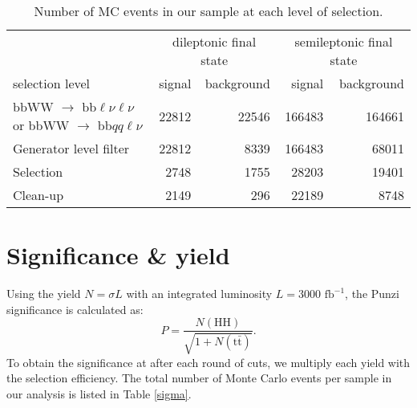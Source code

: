 \documentclass[10pt,a4paper]{article}
\renewcommand{\tt}{$\text{t}\bar{\text{t}}$}
\newcommand{\channels}{bbWW $\rightarrow$ bb$\ell\nu\ell\nu$ or bbWW $\rightarrow$ bb$qq\ell\nu$ }
\begin{document}
\begin{table}[p]
	\centering
	\caption{Number of MC events in our sample at each level of selection.} \vspace{5pt}
	\label{raw}
	\begin{tabular}{@{\quad}lrrrr@{}}
	
	\toprule
	               & \multicolumn{2}{c}{dileptonic final state} & \multicolumn{2}{c}{semileptonic final state} \\
	\cmidrule(r){2-3} \cmidrule(r){4-5}
	selection level              &  signal  & background &  signal  & background \\
	\midrule
	\channels				     &  22812  &  22546 & 166483 & 164661 \\
	Generator level filter &  22812  &   8339 & 166483 &  68011 \\
	Selection                    &   2748  &   1755 &  28203 &  19401 \\
	Clean-up                     &   2149  &    296 &  22189 &   8748 \\
	\bottomrule
	
	\end{tabular}
\end{table}



\section{Significance \& yield}

Using the yield $N = \sigma L$ with an integrated luminosity $L = 3000 \text{ fb}^{-1}$, the Punzi significance is calculated as:
\begin{equation}
	P = \frac{N({\text{HH}})}{\sqrt{1+N({\text{\tt}})}}.
\end{equation}
To obtain the significance at after each round of cuts, we multiply each yield with the selection efficiency. %
The total number of Monte Carlo events per sample in our analysis is listed in Table \ref{sigma}. %
\end{document}
